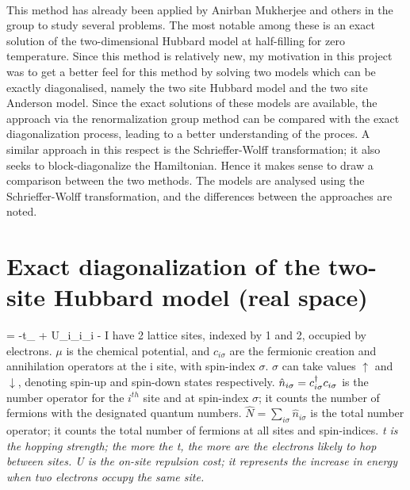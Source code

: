 \documentclass[12pt]{article}
\begin{document}
\paragraph{}
This method has already been applied by Anirban Mukherjee and others in the group to study several problems. The most notable among these is an exact solution of the two-dimensional Hubbard model at half-filling for zero temperature. Since this method is relatively new, my motivation in this project was to get a better feel for this method by solving two models which can be exactly diagonalised, namely the two site Hubbard model and the two site Anderson model. Since the exact solutions of these models are available, the approach via the renormalization group method can be compared with the exact diagonalization process, leading to a better understanding of the proces. A similar approach in this respect is the Schrieffer-Wolff transformation; it also seeks to block-diagonalize the Hamiltonian. Hence it makes sense to draw a comparison between the two methods. The models are analysed using the Schrieffer-Wolff transformation, and the differences between the approaches are noted.
\newpage
\section{Exact diagonalization of the two-site Hubbard model (real space)}

\beq
\ham = -t\sum_\sigma{} + U\sum_i_{i\uparrow}_{i\downarrow} -\mu {}
\eeq
I have 2 lattice sites, indexed by 1 and 2, occupied by electrons. \(\mu\) is the chemical potential,  and \(c_{i\sigma}\) are the fermionic creation and annihilation operators at the i site, with spin-index \(\sigma\). \(\sigma\) can take values \(\uparrow\) and \(\downarrow\), denoting spin-up and spin-down states respectively. \(\hat{n}_{i\sigma}=c_{{i}{\sigma}}^\dagger c_{{i}{\sigma}}\) is the number operator for the \(i^{th}\) site and at spin-index \(\sigma\); it counts the number of fermions with the designated quantum numbers. \(\hat{N}= \sum_{i\sigma}\hat{n}_{i\sigma}\) is the total number operator; it counts the total number of fermions at all sites and spin-indices. \it t is the hopping strength; the more the t, the more are the electrons likely to hop between sites. \it U is the on-site repulsion cost; it represents the increase in energy when two electrons occupy the same site.
\end{document}
